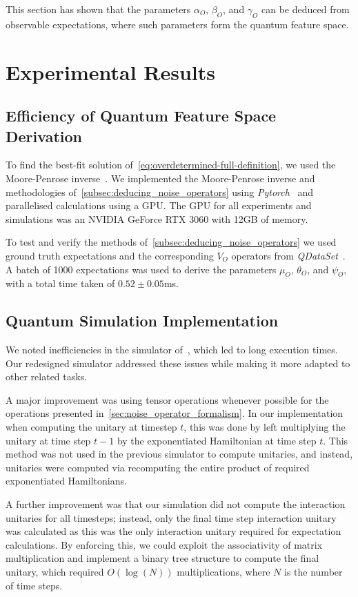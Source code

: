 \documentclass[12pt]{iopart}
\begin{document}
This section has shown that the parameters $\alpha_O$, $\beta_O$, and $\gamma_O$ can be deduced from observable expectations, where such parameters form the quantum feature space.
\section{Experimental Results \label{sec:visulisation_of_noise_operator_parameters}}
\subsection{Efficiency of Quantum Feature Space Derivation \label{sec:quantum_feature_space_derivation_efficiency}}
To find the best-fit solution of~\cref{eq:overdetermined-full-definition}, we used the Moore-Penrose inverse~\cite{penrose1955generalized}. We implemented the Moore-Penrose inverse and methodologies of~\cref{subsec:deducing_noise_operators} using \textit{Pytorch}~\cite{paszke2019pytorch} and parallelised calculations using a GPU. The GPU for all experiments and simulations was an NVIDIA GeForce RTX 3060 with 12GB of memory.

To test and verify the methods of~\cref{subsec:deducing_noise_operators} we used ground truth expectations and the corresponding $V_O$ operators from \textit{QDataSet}~\cite{perrier2022qdataset}. A batch of 1000 expectations was used to derive the parameters $\mu_O$, $\theta_O$, and $\psi_O$, with a total time taken of $0.52 \pm 0.05$ms.
\subsection{Quantum Simulation Implementation \label{subsec:quantum_simulation_implementation}}
We noted inefficiencies in the simulator of~\cite{perrier2022qdataset}, which led to long execution times. Our redesigned simulator addressed these issues while making it more adapted to other related tasks.

A major improvement was using tensor operations whenever possible for the operations presented in~\cref{sec:noise_operator_formalism}. In our implementation when computing the unitary at timestep $t$, this was done by left multiplying the unitary at time step $t-1$ by the exponentiated Hamiltonian at time step $t$. This method was not used in the previous simulator to compute unitaries, and instead, unitaries were computed via recomputing the entire product of required exponentiated Hamiltonians.

A further improvement was that our simulation did not compute the interaction unitaries for all timesteps; instead, only the final time step interaction unitary was calculated as this was the only interaction unitary required for expectation calculations. By enforcing this, we could exploit the associativity of matrix multiplication and implement a binary tree structure to compute the final unitary, which required $O(\log(N))$ multiplications, where $N$ is the number of time steps.
\end{document}
